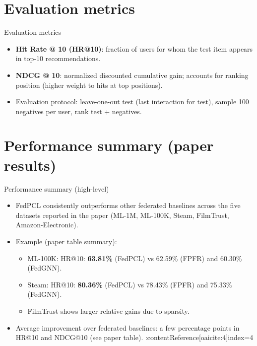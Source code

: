 \documentclass{beamer}
\begin{document}
\section{Evaluation metrics}
\begin{frame}{Evaluation metrics}
  \begin{itemize}
    \item \textbf{Hit Rate @ 10 (HR@10)}: fraction of users for whom the test item appears in top-10 recommendations.
    \item \textbf{NDCG @ 10}: normalized discounted cumulative gain; accounts for ranking position (higher weight to hits at top positions).
    \item Evaluation protocol: leave-one-out test (last interaction for test), sample 100 negatives per user, rank test + negatives.
  \end{itemize}
\end{frame}

\section{Performance summary (paper results)}
\begin{frame}{Performance summary (high-level)}
  \begin{itemize}
    \item FedPCL consistently outperforms other federated baselines across the five datasets reported in the paper (ML-1M, ML-100K, Steam, FilmTrust, Amazon-Electronic).
    \item Example (paper table summary):
      \begin{itemize}
        \item ML-100K: HR@10: \textbf{63.81\%} (FedPCL) vs 62.59\% (FPFR) and 60.30\% (FedGNN).
        \item Steam: HR@10: \textbf{80.36\%} (FedPCL) vs 78.43\% (FPFR) and 75.33\% (FedGNN).
        \item FilmTrust shows larger relative gains due to sparsity.
      \end{itemize}
    \item Average improvement over federated baselines: a few percentage points in HR@10 and NDCG@10 (see paper table). :contentReference[oaicite:4]{index=4}
  \end{itemize}
\end{frame}

\end{document}

